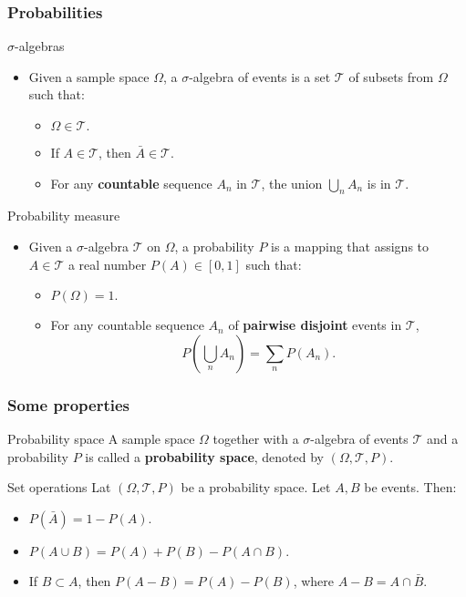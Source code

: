 \begin{frame}
    \frametitle{Probabilities}
    \begin{block}{$\sigma$-algebras}
        \begin{itemize}
            \item<+-> Given a sample space $\Omega$, a $\sigma$-algebra of
            events is a set $\mathcal{T}$ of subsets from $\Omega$ such that:
            \begin{itemize}
                \item<+-> $\Omega \in \mathcal{T}.$
                \item<+-> If $A \in \mathcal{T}$, then $\bar{A} \in \mathcal{T}.$
                \item<+-> For any \textbf{countable} sequence $A_n$ in $\mathcal{T}$, the union
                $\bigcup_n A_n$ is in $\mathcal{T}.$
            \end{itemize}
        \end{itemize}
    \end{block}
\begin{block}{Probability measure}
    \begin{itemize}
        \item<+-> Given a $\sigma$-algebra $\mathcal{T}$ on $\Omega$, a 
        probability $P$ is a mapping that assigns to $A \in \mathcal{T}$ a real
        number $P(A) \in [0,1]$ such that:
        \begin{itemize}
        \item<+-> $P\left( \Omega \right) = 1.$
        \item<+-> For any countable sequence $A_n$ of \textbf{pairwise disjoint} events in $\mathcal{T}$,
        \begin{equation}
             \label{eq:proba_additivty}
            P\left( \bigcup_n A_n \right) = \sum_n P\left( A_n \right).
        \end{equation}
        \end{itemize}
    \end{itemize}
\end{block}
\end{frame}
\begin{frame}
    \frametitle{Some properties}
\begin{block}{Probability space}
A sample space $\Omega$ together with a $\sigma$-algebra of events $\mathcal{T}$ and
a probability $P$ is called a \textbf{probability space}, denoted by 
$\left( \Omega, \mathcal{T}, P \right).$
\end{block}
\begin{block}{Set operations}
    Lat $\left( \Omega, \mathcal{T}, P \right)$ be a probability space. 
    Let $A,B$ be events. Then:
    \begin{itemize}
        \item<+-> $P\left(\bar{A} \right) = 1 - P(A).$
        \item<+-> $P\left( A \cup B \right) = P(A) + P(B) - P\left( A \cap B \right).$
        \item<+-> If $B \subset A$, then $P\left( A - B \right) = P(A) - P(B)$, where
        $A-B = A \cap \bar{B}.$
    \end{itemize}
\end{block}
\end{frame}
